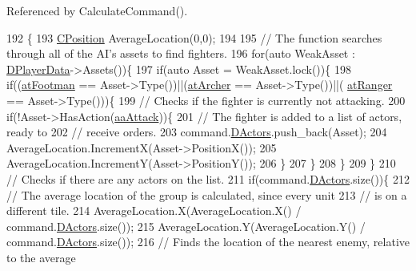 Referenced by Calculate\+Command().


\begin{DoxyCode}
192                                                            \{
193     \hyperlink{classCPosition}{CPosition} AverageLocation(0,0);
194     
195     \textcolor{comment}{// The function searches through all of the AI's assets to find fighters.}
196     \textcolor{keywordflow}{for}(\textcolor{keyword}{auto} WeakAsset : \hyperlink{classCAIPlayer_a83b5113c8f7e80df54940b647c5ee2e6}{DPlayerData}->Assets())\{
197         \textcolor{keywordflow}{if}(\textcolor{keyword}{auto} Asset = WeakAsset.lock())\{
198             \textcolor{keywordflow}{if}((\hyperlink{GameDataTypes_8h_a5600d4fc433b83300308921974477fecad586e8ff9ee846d22630c2066e8fb7c2}{atFootman} == Asset->Type())||(\hyperlink{GameDataTypes_8h_a5600d4fc433b83300308921974477feca7fad0074234068ff0af4092a75b929f8}{atArcher} == Asset->Type())||(
      \hyperlink{GameDataTypes_8h_a5600d4fc433b83300308921974477fecaafd2b1e0ca34872bb06098dbec9939e0}{atRanger} == Asset->Type()))\{
199                 \textcolor{comment}{// Checks if the fighter is currently not attacking.}
200                 \textcolor{keywordflow}{if}(!Asset->HasAction(\hyperlink{GameDataTypes_8h_ab47668e651a3032cfb9c40ea2d60d670a948eefd20b9e43d3b4cfcf613774716d}{aaAttack}))\{
201                     \textcolor{comment}{// The fighter is added to a list of actors, ready to}
202                     \textcolor{comment}{// receive orders.}
203                     command.\hyperlink{structSPlayerCommandRequest_aa37fc01519676345703d78b9f573894a}{DActors}.push\_back(Asset);
204                     AverageLocation.IncrementX(Asset->PositionX());
205                     AverageLocation.IncrementY(Asset->PositionY());
206                 \}
207             \}
208         \}
209     \}
210     \textcolor{comment}{// Checks if there are any actors on the list.}
211     \textcolor{keywordflow}{if}(command.\hyperlink{structSPlayerCommandRequest_aa37fc01519676345703d78b9f573894a}{DActors}.size())\{
212         \textcolor{comment}{// The average location of the group is calculated, since every unit}
213         \textcolor{comment}{// is on a different tile. }
214         AverageLocation.X(AverageLocation.X() / command.\hyperlink{structSPlayerCommandRequest_aa37fc01519676345703d78b9f573894a}{DActors}.size());
215         AverageLocation.Y(AverageLocation.Y() / command.\hyperlink{structSPlayerCommandRequest_aa37fc01519676345703d78b9f573894a}{DActors}.size());
216         \textcolor{comment}{// Finds the location of the nearest enemy, relative to the average }

\end{DoxyCode}
